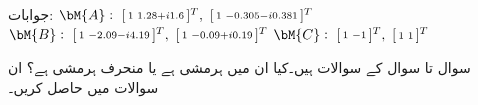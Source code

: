 جوابات: 
$\bM{A}:\,\, [\begin{smallmatrix} 1& 1.28+i1.6 \end{smallmatrix}]^T, \,\, [\begin{smallmatrix} 1&-0.305-i0.381 \end{smallmatrix}]^T$\\
$\bM{B}:\,\, [\begin{smallmatrix} 1& -2.09-i4.19 \end{smallmatrix}]^T, \,\, [\begin{smallmatrix} 1&-0.09+i0.19 \end{smallmatrix}]^T$\quad 
$\bM{C}:\,\, [\begin{smallmatrix} 1& -1 \end{smallmatrix}]^T, \,\, [\begin{smallmatrix} 1&1\end{smallmatrix}]^T$

سوال  تا سوال   کے سوالات ہیں۔کیا ان میں  ہرمشی ہے یا منحرف ہرمشی ہے؟  ان سوالات میں  حاصل کریں۔

